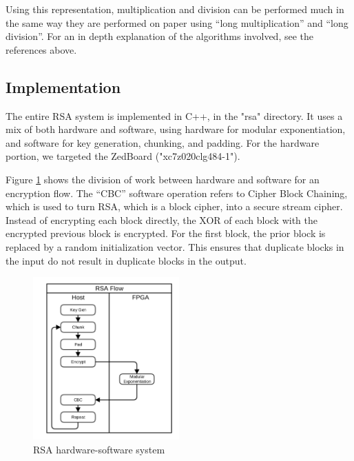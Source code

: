 Using this representation, multiplication and division can be performed much in the same way they are performed on paper using ``long multiplication'' and ``long division''. For an in depth explanation of the algorithms involved, see the references above.


\subsection{Implementation}
The entire RSA system is implemented in C++, in the "rsa" directory. It uses a mix of both hardware and software, using 
hardware for modular exponentiation, and software for key generation, chunking, and padding. 
For the hardware portion, we targeted the ZedBoard ("xc7z020clg484-1").

Figure \ref{fig:rsaflow} shows the division of work between hardware and software for an encryption flow.
The ``CBC'' software operation refers to Cipher Block Chaining, which is used to turn RSA, which is a block cipher,
into a secure stream cipher. Instead of encrypting each block directly, the XOR of each block with the encrypted previous block
is encrypted. For the first block, the prior block is replaced by a random initialization vector. This ensures that duplicate
blocks in the input do not result in duplicate blocks in the output.

\begin{figure}[h]
\centering
\includegraphics[width=0.5\textwidth]{rsaflow}
\caption{RSA hardware-software system}
\label{fig:rsaflow}
\end{figure}

